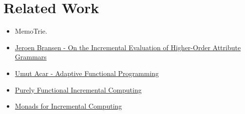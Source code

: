 \chapter{Related Work}

\begin{itemize}
  \item MemoTrie.\cite{hinze2000memo}
  \item \href{http://jeroen.bransen.nl/phdthesis.pdf}{Jeroen Bransen - On the Incremental Evaluation of Higher-Order Attribute Grammars}
  \item \href{https://dl.acm.org/doi/pdf/10.1145/1186632.1186634}{Umut Acar - Adaptive Functional Programming}
  \item \href{http://firsov.ee/incremental/incremental.pdf}{Purely Functional Incremental Computing}
  \item \href{https://dl.acm.org/doi/pdf/10.1145/581478.581482?casa_token=RBzeRZRH7MQAAAAA:LBZY0xz8T3hSkAdb8HXA-i42tQLkTmn2FpILTpjHq2v7AubOSoJCzcm7XorRDwvtCvKXwF8dq5VJWA}{Monads for Incremental Computing}
\end{itemize} 